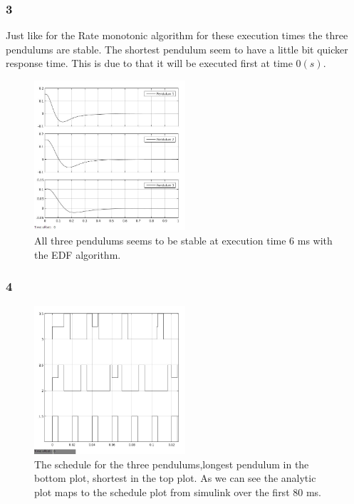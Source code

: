 \documentclass[10pt,a4paper]{article}
\begin{document}
\subsubsection*{3}
Just like for the Rate monotonic algorithm for these execution times the three pendulums are stable. The shortest pendulum seem to have a little bit quicker response time. This is due to that it will be executed first at time $0(s)$. 
\begin{figure}[!ht]
  \centering
    \includegraphics[width=0.5\textwidth]{6msedf.jpg}
      \caption{All three pendulums seems to be stable at execution time 6 ms with the EDF algorithm.}
\end{figure}


\subsubsection*{4}
\begin{figure}[!ht]
  \centering
    \includegraphics[width=0.5\textwidth]{schedual6msedf.jpg}
      \caption{The schedule for the three pendulums,longest pendulum in the bottom plot, shortest in the top plot. As we can see the analytic plot maps to the schedule plot from simulink over the first 80 ms.}
\end{figure}
\newpage
\end{document}
